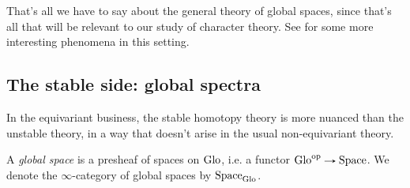 That's all we have to say about the general theory of global spaces,
since that's all that will be relevant to our study of character
theory. See \cite{rezk-global-cohesion} for some more interesting
phenomena in this setting.


\subsection{The stable side: global spectra}
\label{global-stable}

In the equivariant business, the stable homotopy theory is more
nuanced than the unstable theory, in a way that doesn't arise in the
usual non-equivariant theory.

\begin{definition}
  \label{global-spectrum}
  A \emph{global space} is a presheaf of spaces on $\mathrm{Glo}$, i.e. a
  functor $\Glo^\op \to \Space$. We denote the $\infty$-category of
  global spaces by $\mathrm{Space}_{\mathrm{Glo}}$.
\end{definition}

